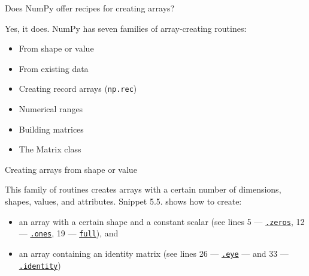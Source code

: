 \documentclass[a4paper,11pt]{book}
\newcommand{\question}[1]{%
    \begin{tcolorbox}[colback=comp_c!10,colframe=comp_c,sidebyside align=top,width=\linewidth,before skip=1ex]
        #1
    \end{tcolorbox}
    \switchcolumn%
}
\newcommand{\note}[1]{%
    \begin{tcolorbox}[colback=white!0,colframe=white!10,width=\linewidth,before skip=1ex]
        #1
    \end{tcolorbox}
}
\begin{document}
\begin{paracol}{2}
	\question{\raggedright Does NumPy offer recipes for creating arrays?}
	\note{Yes, it does. NumPy has seven families of array-creating routines:
	\begin{itemize}
		\item From shape or value
		\item From existing data
		\item Creating record arrays (\texttt{np.rec})
		\item Numerical ranges
		\item Building matrices
		\item The Matrix class
	\end{itemize}}
\end{paracol}

\begin{paracol}{2}
	\question{\raggedright Creating arrays from shape or value}
	\note{This family of routines creates arrays with a certain number of dimensions, shapes, values, and attributes. Snippet 5.5. shows how to create:
	\begin{itemize}
		\item an array with a certain shape and a constant scalar (see lines 5 --- \href{https://numpy.org/doc/stable/reference/generated/numpy.zeros.html\#numpy.zeros}{\texttt{.zeros}}, 12 --- \href{https://numpy.org/doc/stable/reference/generated/numpy.ones.html\#numpy.ones}{\texttt{.ones}}, 19 --- \href{https://numpy.org/doc/stable/reference/generated/numpy.full.html\#numpy.full}{\texttt{full}}), and
		\item an array containing an identity matrix (see lines 26 --- \href{https://numpy.org/doc/stable/reference/generated/numpy.eye.html\#numpy.eye}{\texttt{.eye}} --- and 33 --- \href{https://numpy.org/doc/stable/reference/generated/numpy.identity.html\#numpy.identity}{\texttt{.identity}})
	\end{itemize}} 
\end{paracol}
\clearpage
\end{document}
